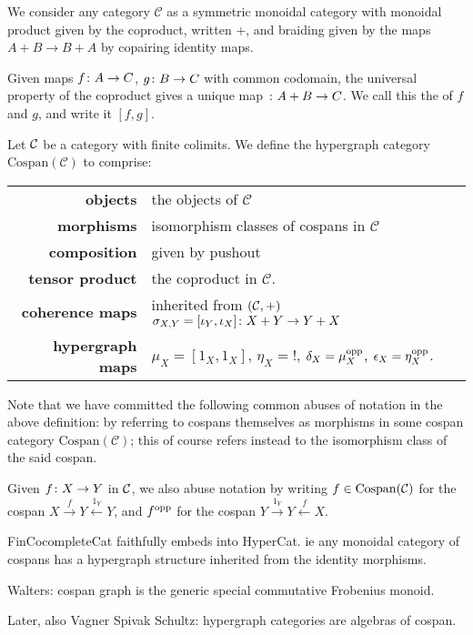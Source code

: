 We consider any category $\mathcal C$ as a symmetric monoidal category with
monoidal product given by the coproduct, written $+$, and braiding given by the
maps $A+B \to B+A$ by copairing identity maps. 

Given maps $f {\colon} A \to C$, $g {\colon} B \to C$ with common codomain, the
universal property of the coproduct gives a unique map ${\colon} A+B \to C$. We
call this the  of $f$ and $g$, and write it $[f,g]$. 

\begin{definition} \label{thm.cospanwelldef}
  Let $\mathcal C$ be a category with finite colimits. We define the hypergraph
  category $\mathrm{Cospan}(\mathcal C)$ to comprise:
  
  \begin{tabular}{ r p{}}
    \textbf{objects} & the objects of $\mathcal C$ \\ 
    \textbf{morphisms} & isomorphism classes of cospans in
    $\mathcal C$\\ 
  \textbf{composition} & given by pushout \\
  \textbf{tensor product} & the coproduct in $\mathcal C$. \\
  \textbf{coherence maps} & inherited from $(\mathcal C,+)$ $\sigma_{X,Y} = [\iota_Y,\iota_X] {\colon} X+Y
      \to Y+X$\\
  \textbf{hypergraph maps} & $\mu_X = [1_X,1_X]$, $\eta_X = !$,
      $\delta_X = \mu_X^{\mathrm{opp}}$, $\epsilon_X = \eta_X^{\mathrm{opp}}$.
  \end{tabular}
\end{definition}

\begin{notation}
Note that we have committed the following common abuses of notation in the above
definition: by referring to cospans themselves as
  morphisms in some cospan category $\mathrm{Cospan}(\mathcal C)$; this of
  course refers instead to the isomorphism class of the said cospan.

  Given $f {\colon} X \to Y$ in $\mathcal C$, we also abuse notation by writing $f \in
  \mathrm{Cospan}(\mathcal C)$ for the cospan $X \stackrel{f}\to Y
  \stackrel{1_Y}\leftarrow Y$, and $f^{\mathrm{opp}}$ for the cospan $Y \stackrel{1_Y}\to
  Y \stackrel{f}\leftarrow X$.
\end{notation}

FinCocompleteCat faithfully embeds into HyperCat. ie any monoidal category of
cospans has a hypergraph structure inherited from the identity morphisms.


Walters: cospan graph is the generic special commutative Frobenius monoid.

Later, also Vagner Spivak Schultz: hypergraph categories are algebras of cospan.

